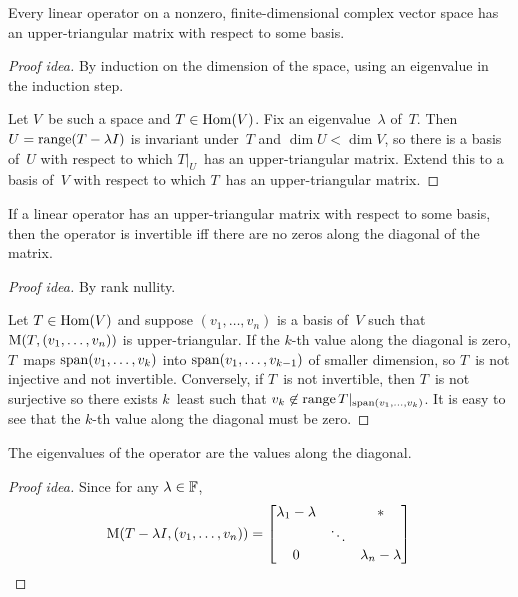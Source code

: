 \begin{cor}
Every linear operator on a nonzero, finite-dimensional complex vector space has an upper-triangular matrix with respect to some basis.
\end{cor}
\begin{proof}[Proof idea]
By induction on the dimension of the space, using an eigenvalue in the induction step.

Let \(V\)~be such a space and \(T\in\operatorname{Hom}(V)\). Fix an eigenvalue~\(\lambda\) of~\(T\). Then \(U=\operatorname{range}(T-\lambda I)\) is invariant under~\(T\) and \(\dim U<\dim V\), so there is a basis of~\(U\) with respect to which \(T|_U\)~has an upper-triangular matrix. Extend this to a basis of~\(V\) with respect to which \(T\)~has an upper-triangular matrix.
\end{proof}

\begin{thm}
If a linear operator has an upper-triangular matrix with respect to some basis, then the operator is invertible iff there are no zeros along the diagonal of the matrix.
\end{thm}
\begin{proof}[Proof idea]
By rank nullity.

Let \(T\in\operatorname{Hom}(V)\) and suppose \((v_1,\ldots,v_n)\) is a basis of~\(V\) such that \(\operatorname{M}(T,(v_1,\ldots,v_n))\) is upper-triangular. If the \(k\)-th value along the diagonal is zero, \(T\)~maps \(\operatorname{span}(v_1,\ldots,v_k)\) into \(\operatorname{span}(v_1,\ldots,v_{k-1})\) of smaller dimension, so \(T\)~is not injective and not invertible. Conversely, if \(T\)~is not invertible, then \(T\)~is not surjective so there exists \(k\)~least such that \(v_k\not\in\operatorname{range} T|_{\operatorname{span}(v_1,\ldots,v_k)}\). It is easy to see that the \(k\)-th value along the diagonal must be zero.
\end{proof}

\begin{cor}
The eigenvalues of the operator are the values along the diagonal.
\end{cor}
\begin{proof}[Proof idea]
Since for any \(\lambda\in\mathbb{F}\),
\begin{equation*}
\operatorname{M}(T-\lambda I,(v_1,\ldots,v_n))=\left[\begin{matrix}
\lambda_1-\lambda&&*\\
&\ddots&\\
0&&\lambda_n-\lambda
\end{matrix}\right]\qedhere
\end{equation*}
\end{proof}

